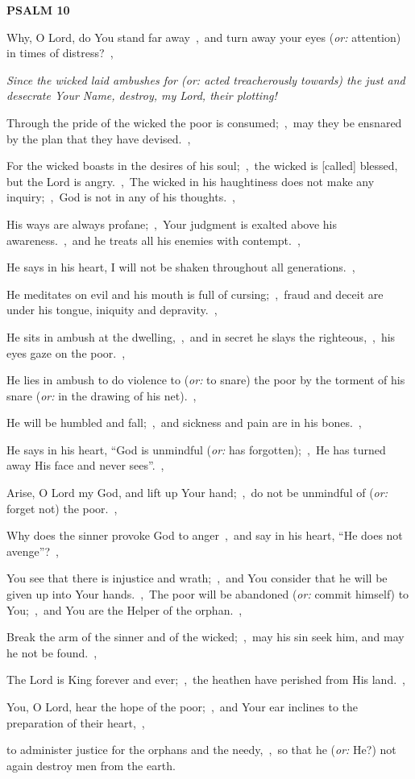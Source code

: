 \documentclass[12pt,twoside,a5paper]{article}
\newcommand{\psalm}[1]{\textbf{PSALM {#1}}}
\newcommand{\qanona}[1]{{\liturgicalhint{Qanona.} \emph{#1}}}
\newcommand{\translationoption}[1]{\emph{or:} #1}
\begin{document}
\psalm{10}

\begin{normalparskip}
  Why, O Lord, do You stand far away~\sep\ and turn away your eyes (\translationoption{attention}) in times of distress?~\sep

  \qanona{Since the wicked laid ambushes for (\translationoption{acted treacherously towards}) the just and desecrate Your Name, destroy, my Lord, their plotting!}

  Through the pride of the wicked the poor is consumed;~\sep\ may they be ensnared by the plan that they have devised.~\sep

  For the wicked boasts in the desires of his soul;~\sep\ the wicked is [called] blessed, but the Lord is angry.~\sep\ The wicked in his haughtiness does not make any inquiry;~\sep\ God is not in any of his thoughts.~\sep

  His ways are always profane;~\sep\ Your judgment is exalted above his awareness.~\sep\ and he treats all his enemies with contempt.~\sep

  He says in his heart, I will not be shaken throughout all generations.~\sep

  He meditates on evil and his mouth is full of cursing;~\sep\ fraud and deceit are under his tongue, iniquity and depravity.~\sep

  He sits in ambush at the dwelling,~\sep\ and in secret he slays the righteous,~\sep\ his eyes gaze on the poor.~\sep

  He lies in ambush to do violence to (\translationoption{to snare}) the poor by the torment of his snare (\translationoption{in the drawing of his net}).~\sep

  He will be humbled and fall;~\sep\ and sickness and pain are in his bones.~\sep

  He says in his heart, ``God is unmindful (\translationoption{has forgotten});~\sep\ He has turned away His face and never sees''.~\sep

  Arise, O Lord my God, and lift up Your hand;~\sep\ do not be unmindful of (\translationoption{forget not}) the poor.~\sep

  Why does the sinner provoke God to anger~\sep\ and say in his heart, ``He does not avenge''?~\sep

  You see that there is injustice and wrath;~\sep\ and You consider that he will be given up into Your hands.~\sep\ The poor will be abandoned (\translationoption{commit himself}) to You;~\sep\ and You are the Helper of the orphan.~\sep

  Break the arm of the sinner and of the wicked;~\sep\ may his sin seek him, and may he not be found.~\sep

  The Lord is King forever and ever;~\sep\ the heathen have perished from His land.~\sep

  You, O Lord, hear the hope of the poor;~\sep\ and Your ear inclines to the preparation of their heart,~\sep

  to administer justice for the orphans and the needy,~\sep\ so that he (\translationoption{He?}) not again destroy men from the earth.
\end{normalparskip}
\end{document}
